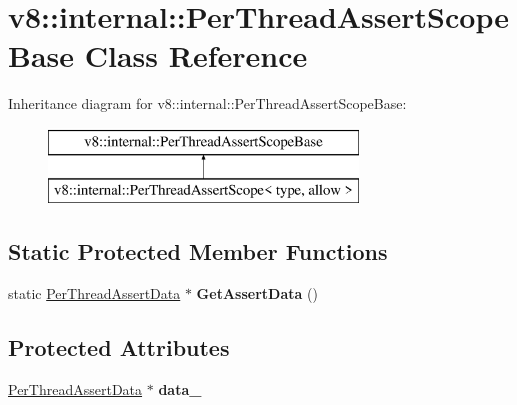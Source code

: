 \hypertarget{classv8_1_1internal_1_1_per_thread_assert_scope_base}{}\section{v8\+:\+:internal\+:\+:Per\+Thread\+Assert\+Scope\+Base Class Reference}
\label{classv8_1_1internal_1_1_per_thread_assert_scope_base}
Inheritance diagram for v8\+:\+:internal\+:\+:Per\+Thread\+Assert\+Scope\+Base\+:\begin{figure}[H]
\begin{center}
\leavevmode
\includegraphics[height=2.000000cm]{classv8_1_1internal_1_1_per_thread_assert_scope_base}
\end{center}
\end{figure}
\subsection*{Static Protected Member Functions}
\begin{DoxyCompactItemize}
\item 
\hypertarget{classv8_1_1internal_1_1_per_thread_assert_scope_base_a79f6195ac0023794f246fe171cd84c60}{}static \hyperlink{classv8_1_1internal_1_1_per_thread_assert_data}{Per\+Thread\+Assert\+Data} $\ast$ {\bfseries Get\+Assert\+Data} ()\label{classv8_1_1internal_1_1_per_thread_assert_scope_base_a79f6195ac0023794f246fe171cd84c60}

\end{DoxyCompactItemize}
\subsection*{Protected Attributes}
\begin{DoxyCompactItemize}
\item 
\hypertarget{classv8_1_1internal_1_1_per_thread_assert_scope_base_ab2906dd2428f2ba1fa8903c11262566b}{}\hyperlink{classv8_1_1internal_1_1_per_thread_assert_data}{Per\+Thread\+Assert\+Data} $\ast$ {\bfseries data\+\_\+}\label{classv8_1_1internal_1_1_per_thread_assert_scope_base_ab2906dd2428f2ba1fa8903c11262566b}

\end{DoxyCompactItemize}
